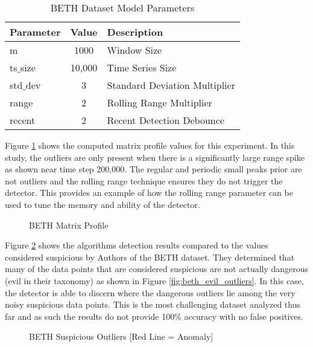 \begin{table}[H]
\caption{BETH Dataset Model Parameters}
\begin{tabular}{|l|c|l|}
    \hline
	\textbf{Parameter} & \textbf{Value} & \textbf{Description} \\ \hline
	m & 1000 & Window Size \\ \hline
	ts$\_$size & 10,000 & Time Series Size \\ \hline
	std$\_$dev & 3 & Standard Deviation Multiplier \\ \hline
	range & 2 & Rolling Range Multiplier\\ \hline
	recent & 2 & Recent Detection Debounce\\ \hline
\end{tabular}
\label{tab:beth_sim_params}
\end{table}

Figure \ref{fig:beth_mp_hist} shows the computed matrix profile values for this experiment. In this study, the outliers are only present when there is a significantly large range spike as shown near time step 200,000. The regular and periodic small peaks prior are not outliers and the rolling range technique ensures they do not trigger the detector. This provides an example of how the rolling range parameter can be used to tune the memory and ability of the detector. 

\begin{figure}[H]
    
    \caption{BETH Matrix Profile}
    \label{fig:beth_mp_hist}
\end{figure}

Figure \ref{fig:beth_sus_outliers} shows the algorithms detection results compared to the values considered suspicious by Authors \cite{beth-dataset} of the BETH dataset. They determined that many of the data points that are considered suspicious are not actually dangerous (evil in their taxonomy) as shown in Figure \ref{fig:beth_evil_outliers}. In this case, the detector is able to discern where the dangerous outliers lie among the very noisy suspicious data points. This is the most challenging dataset analyzed thus far and as such the results do not provide 100\% accuracy with no false positives.

 \begin{figure}[H]
    
    \caption{BETH Suspicious Outliers [Red Line = Anomaly]}
    \label{fig:beth_sus_outliers}
\end{figure}

